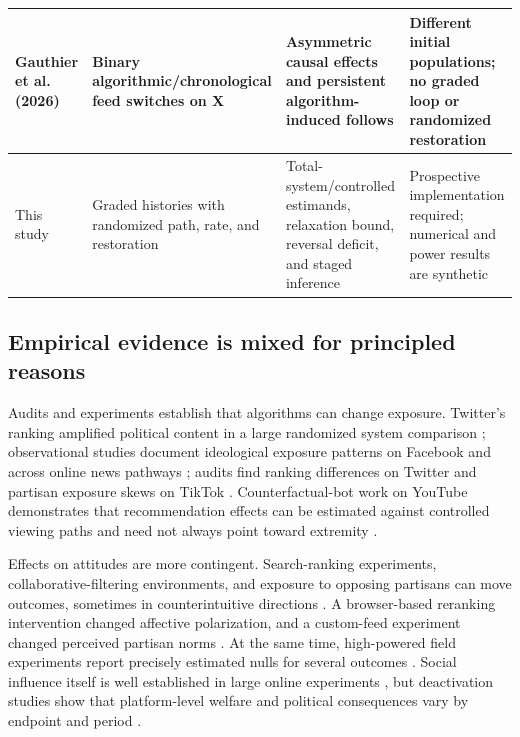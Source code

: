 \documentclass[pdflatex,sn-mathphys-num]{sn-jnl}
\begin{document}
\begin{table}[!htbp]
\begin{tabularx}{\textwidth}{|p{2.6cm}|Y|Y|Y|}
\hline
Gauthier et al. (2026) & Binary algorithmic/chronological feed switches on X & Asymmetric causal effects and persistent algorithm-induced follows & Different initial populations; no graded loop or randomized restoration\\
\hline
This study & Graded histories with randomized path, rate, and restoration & Total-system/controlled estimands, relaxation bound, reversal deficit, and staged inference & Prospective implementation required; numerical and power results are synthetic\\
\hline
\end{tabularx}
\end{table}

\subsection{Empirical evidence is mixed for principled reasons}

Audits and experiments establish that algorithms can change exposure. Twitter's ranking amplified political content in a large randomized system comparison \cite{huszar2022amplification}; observational studies document ideological exposure patterns on Facebook and across online news pathways \cite{bakshy2015exposure,flaxman2016bubbles}; audits find ranking differences on Twitter and partisan exposure skews on TikTok \cite{bandy2021twitter,ibrahim2026tiktok}. Counterfactual-bot work on YouTube demonstrates that recommendation effects can be estimated against controlled viewing paths and need not always point toward extremity \cite{hosseinmardi2024youtube}.

Effects on attitudes are more contingent. Search-ranking experiments, collaborative-filtering environments, and exposure to opposing partisans can move outcomes, sometimes in counterintuitive directions \cite{cho2020search,neumann2023curation,bail2018opposing}. A browser-based reranking intervention changed affective polarization, and a custom-feed experiment changed perceived partisan norms \cite{piccardi2025reranking,brady2026norms}. At the same time, high-powered field experiments report precisely estimated nulls for several outcomes \cite{guess2023feeds,nyhan2023likeminded,guess2023reshares}. Social influence itself is well established in large online experiments \cite{muchnik2013influence,bond2012mobilization}, but deactivation studies show that platform-level welfare and political consequences vary by endpoint and period \cite{allcott2024deactivation}.
\end{document}
